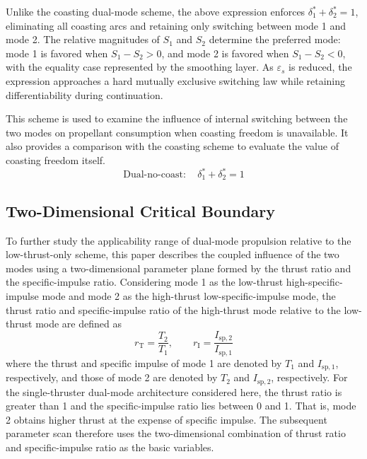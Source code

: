 ﻿\documentclass{IEEEtaes}
\begin{document}
Unlike the coasting dual-mode scheme, the above expression enforces $\delta_1^{*}+\delta_2^{*}=1$, eliminating all coasting arcs and retaining only switching between mode 1 and mode 2. The relative magnitudes of $S_1$ and $S_2$ determine the preferred mode: mode 1 is favored when $S_1-S_2>0$, and mode 2 is favored when $S_1-S_2<0$, with the equality case represented by the smoothing layer. As $\varepsilon_s$ is reduced, the expression approaches a hard mutually exclusive switching law while retaining differentiability during continuation.

This scheme is used to examine the influence of internal switching between the two modes on propellant consumption when coasting freedom is unavailable. It also provides a comparison with the coasting scheme to evaluate the value of coasting freedom itself.
\begin{equation}
\text{Dual-no-coast}:\quad \delta_1^{*}+\delta_2^{*}=1
\end{equation}
\subsection{Two-Dimensional Critical Boundary}
To further study the applicability range of dual-mode propulsion relative to the low-thrust-only scheme, this paper describes the coupled influence of the two modes using a two-dimensional parameter plane formed by the thrust ratio and the specific-impulse ratio. Considering mode 1 as the low-thrust high-specific-impulse mode and mode 2 as the high-thrust low-specific-impulse mode, the thrust ratio and specific-impulse ratio of the high-thrust mode relative to the low-thrust mode are defined as
\begin{equation}
r_{\mathrm{T}}=\frac{T_2}{T_1},\qquad r_{\mathrm{I}}=\frac{I_{\mathrm{sp},2}}{I_{\mathrm{sp},1}}
\end{equation}
where the thrust and specific impulse of mode 1 are denoted by $T_1$ and $I_{\mathrm{sp},1}$, respectively, and those of mode 2 are denoted by $T_2$ and $I_{\mathrm{sp},2}$, respectively. For the single-thruster dual-mode architecture considered here, the thrust ratio is greater than 1 and the specific-impulse ratio lies between 0 and 1. That is, mode 2 obtains higher thrust at the expense of specific impulse. The subsequent parameter scan therefore uses the two-dimensional combination of thrust ratio and specific-impulse ratio as the basic variables.
\end{document}
